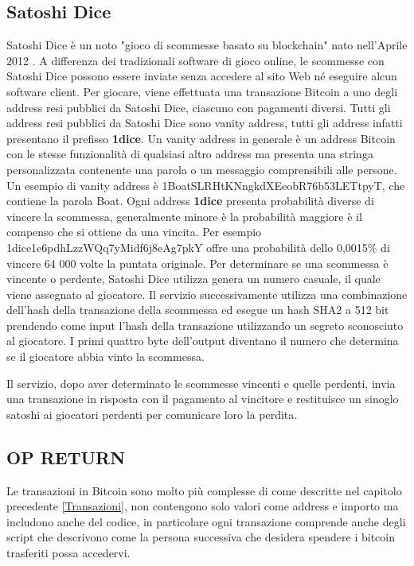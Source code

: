 \subsection{Satoshi Dice}
Satoshi Dice è un noto "gioco di scommesse basato su blockchain" nato nell'Aprile 2012 \cite{SD}. A differenza dei tradizionali software di gioco online, le scommesse con Satoshi Dice possono essere inviate senza accedere al sito Web né eseguire alcun software client. Per giocare, viene effettuata una transazione Bitcoin a uno degli address resi pubblici da Satoshi Dice, ciascuno con pagamenti diversi. Tutti gli address resi pubblici da Satoshi Dice sono vanity address, tutti gli address infatti presentano il prefisso \textbf{1dice}. Un vanity address in generale è un address Bitcoin con le stesse funzionalità di qualsiasi altro address ma presenta una stringa personalizzata contenente una parola o un messaggio comprensibili alle persone. Un esempio di vanity address è 1BoatSLRHtKNngkdXEeobR76b53LETtpyT, che contiene la parola Boat. Ogni address \textbf{1dice} presenta probabilità diverse di vincere la scommessa, generalmente minore è la probabilità maggiore è il compenso che si ottiene da una vincita. Per esempio 1dice1e6pdhLzzWQq7yMidf6j8eAg7pkY offre una probabilità dello 0,0015\% di vincere 64 000 volte la puntata originale. Per determinare se una scommessa è vincente o perdente, Satoshi Dice utilizza genera un numero casuale, il quale viene assegnato al giocatore. Il servizio successivamente utilizza una combinazione dell'hash della transazione della scommessa ed esegue un hash SHA2 a 512 bit prendendo come input l'hash della transazione utilizzando un segreto sconosciuto al giocatore. I primi quattro byte dell'output diventano il numero che determina se il giocatore abbia vinto la scommessa.

Il servizio, dopo aver determinato le scommesse vincenti e quelle perdenti, invia una transazione in risposta con il pagamento al vincitore e restituisce un sinoglo satoshi ai giocatori perdenti per comunicare loro la perdita.
\subsection{OP RETURN}
Le transazioni in Bitcoin sono molto più complesse \cite{script} di come descritte nel capitolo precedente \ref{Transazioni}, non contengono solo valori come address e importo ma includono anche del codice, in particolare ogni transazione comprende anche degli script che descrivono come la persona successiva che desidera spendere i bitcoin trasferiti possa accedervi. 


